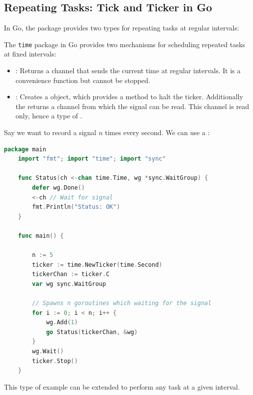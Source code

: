 \newpage 
\subsection{Repeating Tasks: Tick and Ticker in Go}

In Go, the  package provides two types for repeating tasks at regular intervals:

\begin{Def}

    The \texttt{time} package in Go provides two mechanisms for scheduling repeated tasks at fixed intervals:
    
    \begin{itemize}
        \item \textbf{}: Returns a channel that sends the current time at regular intervals. It is a convenience function but \textbf{}{cannot be stopped}.
        \item \textbf{}: Creates a  object, which provides a  method to halt the ticker. Additionally the  returns a channel from which the signal can be read.
        This channel is read only, hence a type of .
    \end{itemize}
\end{Def}

\begin{Example}

    Say we want to record a signal $n$ times every second. We can use a :
    \begin{lstlisting}[language=Go, numbers=none]
    package main
    import "fmt"; import "time"; import "sync"
    
    func Status(ch <-chan time.Time, wg *sync.WaitGroup) {
        defer wg.Done()
        <-ch // Wait for signal
        fmt.Println("Status: OK")
    }
    
    func main() {
    
        n := 5
        ticker := time.NewTicker(time.Second)
        tickerChan := ticker.C
        var wg sync.WaitGroup
    
        // Spawns n goroutines which waiting for the signal
        for i := 0; i < n; i++ {
            wg.Add(1)
            go Status(tickerChan, &wg)
        }
        wg.Wait()
        ticker.Stop()
    }
    \end{lstlisting}

    \noindent
    This type of example can be extended to perform any task at a given interval.
\end{Example}
    
